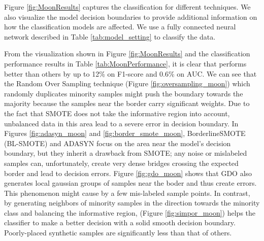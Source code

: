 Figure \ref{fig:MoonResults} captures the classification for different techniques. We also visualize the model decision boundaries to provide additional information on how the classification models are affected. We use a fully connected neural network described in Table \ref{tab:model_setting} to classify the data.

\begin{table}[htbp]
	\centering
	\caption{Classification result on Moon dataset.}
	\label{tab:MoonPerformance}
\end{table}%


From the visualization shown in Figure \ref{fig:MoonResults} and the classification performance results in Table \ref{tab:MoonPerformance}, it is clear that \Methodname{} performs better than others by up to 12\% on F1-score and 0.6\% on AUC. We can see that the Random Over Sampling technique (Figure \ref{fig:oversampling_moon}) which randomly duplicates minority samples might push the boundary towards the majority because the samples near the border carry significant weights. Due to the fact that SMOTE does not take the informative region into account, unbalanced data in this area lead to a severe error in decision boundary. In Figures \ref{fig:adasyn_moon} and \ref{fig:border_smote_moon}, BorderlineSMOTE (BL-SMOTE) and ADASYN focus on the area near the model's decision boundary, but they inherit a drawback from SMOTE; any noise or mislabeled samples can, unfortunately, create very dense bridges crossing the expected border and lead to decision errors. Figure \ref{fig:gdo_moon} shows that GDO also generates local gaussian groups of samples near the boder and thus create errors. This phenomenon might cause by a few mis-labeled sample points. In contrast, by generating neighbors of minority samples in the direction towards the minority class and balancing the informative region, \Methodname{} (Figure \ref{fig:simpor_moon}) helps the classifier to make a better decision with a solid smooth decision boundary. Poorly-placed synthetic samples are significantly less than that of others. 


